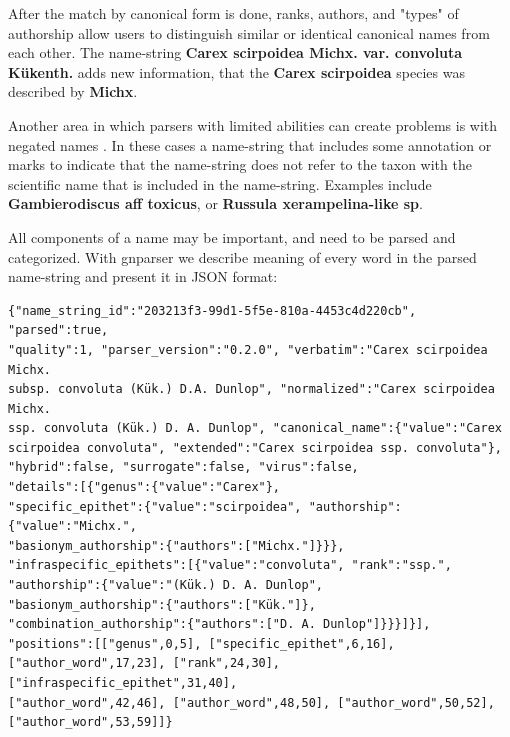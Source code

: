 \documentclass{bmcart}
\begin{document}
After the match by canonical form is done, ranks, authors, and "types" of
authorship allow users to distinguish similar or identical canonical names from
each other. The name-string \textbf{Carex scirpoidea Michx. var. convoluta
Kükenth.} adds new information, that the \textbf{Carex scirpoidea} species was
described by \textbf{Michx}.

Another area in which parsers with limited abilities can create problems is
with negated names \cite{Patterson:inpress-a}. In these cases a name-string
that includes some annotation or marks to indicate that the name-string does
not refer to the taxon with the scientific name that is included in the
name-string. Examples include \textbf{Gambierodiscus aff toxicus}, or
\textbf{Russula xerampelina-like sp}.

All components of a name may be important, and need to be parsed and
categorized. With gnparser we describe meaning of every word in the parsed
name-string and present it in JSON format:

\vspace{0.5cm}

\begin{Verbatim}[fontsize=\small]
{"name_string_id":"203213f3-99d1-5f5e-810a-4453c4d220cb", "parsed":true,
"quality":1, "parser_version":"0.2.0", "verbatim":"Carex scirpoidea Michx.
subsp. convoluta (Kük.) D.A. Dunlop", "normalized":"Carex scirpoidea Michx.
ssp. convoluta (Kük.) D. A. Dunlop", "canonical_name":{"value":"Carex
scirpoidea convoluta", "extended":"Carex scirpoidea ssp. convoluta"},
"hybrid":false, "surrogate":false, "virus":false,
"details":[{"genus":{"value":"Carex"},
"specific_epithet":{"value":"scirpoidea", "authorship":{"value":"Michx.",
"basionym_authorship":{"authors":["Michx."]}}},
"infraspecific_epithets":[{"value":"convoluta", "rank":"ssp.",
"authorship":{"value":"(Kük.) D. A. Dunlop",
"basionym_authorship":{"authors":["Kük."]},
"combination_authorship":{"authors":["D. A. Dunlop"]}}}]}],
"positions":[["genus",0,5], ["specific_epithet",6,16],
["author_word",17,23], ["rank",24,30], ["infraspecific_epithet",31,40],
["author_word",42,46], ["author_word",48,50], ["author_word",50,52],
["author_word",53,59]]}
\end{Verbatim}

\vspace{0.5cm}
\end{document}
